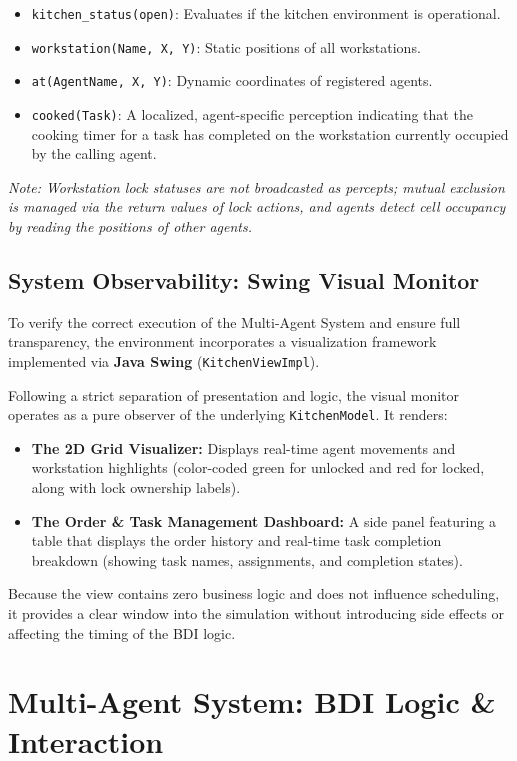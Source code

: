\documentclass{scrartcl}
\begin{document}
\begin{itemize}
\item \texttt{kitchen\_status(open)}: Evaluates if the kitchen environment is operational.
\item \texttt{workstation(Name, X, Y)}: Static positions of all workstations.
\item \texttt{at(AgentName, X, Y)}: Dynamic coordinates of registered agents.
\item \texttt{cooked(Task)}: A localized, agent-specific perception indicating that the cooking timer for a task has completed on the workstation currently occupied by the calling agent.
\end{itemize}

\textit{Note: Workstation lock statuses are not broadcasted as percepts; mutual exclusion is managed via the return values of lock actions, and agents detect cell occupancy by reading the positions of other agents.}


\subsection{System Observability: Swing Visual Monitor}

To verify the correct execution of the Multi-Agent System and ensure full transparency, the environment incorporates a visualization framework implemented via \textbf{Java Swing} (\texttt{KitchenViewImpl}).

Following a strict separation of presentation and logic, the visual monitor operates as a pure observer of the underlying \texttt{KitchenModel}. It renders:
\begin{itemize}
\item \textbf{The 2D Grid Visualizer:} Displays real-time agent movements and workstation highlights (color-coded green for unlocked and red for locked, along with lock ownership labels).
\item \textbf{The Order \& Task Management Dashboard:} A side panel featuring a table that displays the order history and real-time task completion breakdown (showing task names, assignments, and completion states).
\end{itemize}

Because the view contains zero business logic and does not influence scheduling, it provides a clear window into the simulation without introducing side effects or affecting the timing of the BDI logic.


\newpage
\section{Multi-Agent System: BDI Logic \& Interaction}
\end{document}
